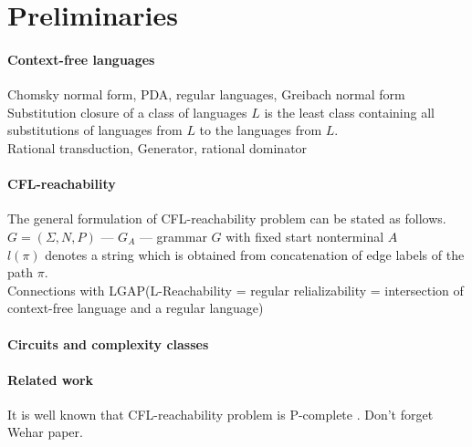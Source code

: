 \section{Preliminaries}
\label{sec:prel}
\label{preliminaries}
\paragraph{Context-free languages} 
Chomsky normal form, PDA, regular languages, Greibach normal form
\\Substitution closure of a class of languages $L$ is the least class containing all substitutions of languages from $L$ to the languages from $L$.
\\Rational transduction, Generator, rational dominator
\paragraph{CFL-reachability} 
The general formulation of CFL-reachability problem can be stated as follows.
$G = (\Sigma, N, P)$ --- $G_A$ --- grammar $G$ with fixed start nonterminal $A$
\\$l(\pi)$ denotes a string which is obtained from concatenation of edge labels of the path $\pi$.
\\Connections with LGAP(L-Reachability = regular relializability = intersection of context-free language and a regular language)
\paragraph{Circuits and complexity classes} 
\paragraph{Related work}  It is well known that CFL-reachability problem is P-complete \cite{Yannakakis}.  Don't forget Wehar paper.